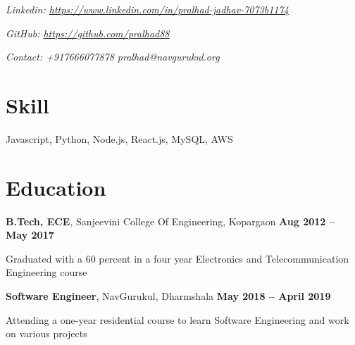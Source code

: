 \documentclass[margin,line]{resume}
\begin{document}
\begin{resume}
    \hfill \textsl{Linkedin: \url{https://www.linkedin.com/in/pralhad-jadhav-7073b1174}} 

    \hfill \textsl{GitHub: \url{https://github.com/pralhad88}} 

    \hfill \textsl{Contact: +917666077878 pralhad@navgurukul.org}
    \section{\mysidestyle Skill}
    Javascript, Python, Node.js, React.js, MySQL, AWS \vspace{-1.5mm}
    
    \section {\mysidestyle Education}

    \textbf{B.Tech, ECE}, Sanjeevini College Of Engineering, Kopargaon \hfill \textbf{Aug 2012 -- May 2017}
    \begin{list2}
        \item Graduated with a 60 percent in a four year Electronics and Telecommunication Engineering course
    \end{list2}\vspace{-1.5mm}

    \textbf{Software Engineer}, NavGurukul, Dharmshala \hfill \textbf{May 2018 -- April 2019}
    \begin{list2}
        \item Attending a one-year residential course to learn Software Engineering and work on various projects
    \end{list2}\vspace{-1.5mm}


\end{resume}
\end{document}
